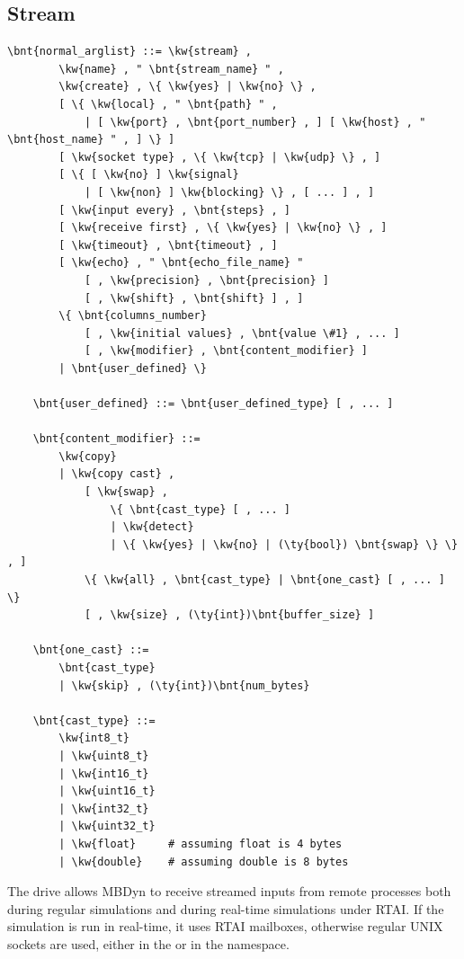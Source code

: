 \subsection{Stream}\label{sec:Stream}
\begin{Verbatim}[commandchars=\\\{\}]
    \bnt{normal_arglist} ::= \kw{stream} ,
        \kw{name} , " \bnt{stream_name} " ,
        \kw{create} , \{ \kw{yes} | \kw{no} \} ,
        [ \{ \kw{local} , " \bnt{path} " ,
            | [ \kw{port} , \bnt{port_number} , ] [ \kw{host} , " \bnt{host_name} " , ] \} ]
        [ \kw{socket type} , \{ \kw{tcp} | \kw{udp} \} , ]
        [ \{ [ \kw{no} ] \kw{signal}
            | [ \kw{non} ] \kw{blocking} \} , [ ... ] , ]
        [ \kw{input every} , \bnt{steps} , ]
        [ \kw{receive first} , \{ \kw{yes} | \kw{no} \} , ]
        [ \kw{timeout} , \bnt{timeout} , ]
        [ \kw{echo} , " \bnt{echo_file_name} "
            [ , \kw{precision} , \bnt{precision} ]
            [ , \kw{shift} , \bnt{shift} ] , ]
        \{ \bnt{columns_number}
            [ , \kw{initial values} , \bnt{value \#1} , ... ]
            [ , \kw{modifier} , \bnt{content_modifier} ]
        | \bnt{user_defined} \}

    \bnt{user_defined} ::= \bnt{user_defined_type} [ , ... ]

    \bnt{content_modifier} ::=
        \kw{copy}
        | \kw{copy cast} ,
            [ \kw{swap} ,
                \{ \bnt{cast_type} [ , ... ]
                | \kw{detect}
                | \{ \kw{yes} | \kw{no} | (\ty{bool}) \bnt{swap} \} \} , ]
            \{ \kw{all} , \bnt{cast_type} | \bnt{one_cast} [ , ... ] \}
            [ , \kw{size} , (\ty{int})\bnt{buffer_size} ]

    \bnt{one_cast} ::=
        \bnt{cast_type}
        | \kw{skip} , (\ty{int})\bnt{num_bytes}

    \bnt{cast_type} ::=
        \kw{int8_t}
        | \kw{uint8_t}
        | \kw{int16_t}
        | \kw{uint16_t}
        | \kw{int32_t}
        | \kw{uint32_t}
        | \kw{float}     # assuming float is 4 bytes
        | \kw{double}    # assuming double is 8 bytes

\end{Verbatim}
The  drive allows MBDyn to receive streamed inputs 
from remote processes both during regular simulations and during 
real-time simulations under RTAI.
If the simulation is run in real-time, it uses RTAI mailboxes, 
otherwise regular UNIX sockets are used, either in the  or 
in the  namespace.

